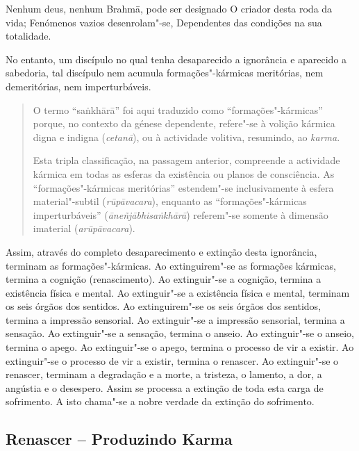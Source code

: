 
\clearpage

Nenhum deus, nenhum Brahmā, pode ser designado O criador desta roda da vida;
Fenómenos vazios desenrolam"-se, Dependentes das condições na sua totalidade.


No entanto, um discípulo no qual tenha desaparecido a ignorância e aparecido a
sabedoria, tal discípulo nem acumula formações"-kármicas meritórias, nem
demeritórias, nem imperturbáveis.


\begin{quote}
  O termo “sa\.{n}khārā” foi aqui traduzido como “formações"-kármicas” porque, no
  contexto da génese dependente, refere"-se à volição kármica digna e indigna
  (\emph{cetanā}), ou à actividade volitiva, resumindo, ao \emph{karma}.

  Esta tripla classificação, na passagem anterior, compreende a actividade
  kármica em todas as esferas da existência ou planos de consciência. As
  “formações"-kármicas meritórias” estendem"-se inclusivamente à esfera
  material"-subtil (\emph{rūpāvacara}), enquanto as “formações"-kármicas
  imperturbáveis” (\emph{āneñjābhisa\.{n}khārā}) referem"-se somente à dimensão
  imaterial (\emph{arūpāvacara}).
\end{quote}

Assim, através do completo desaparecimento e extinção desta ignorância, terminam
as formações"-kármicas. Ao extinguirem"-se as formações kármicas, termina a
cognição (renascimento). Ao extinguir"-se a cognição, termina a existência física
e mental. Ao extinguir"-se a existência física e mental, terminam os seis órgãos
dos sentidos. Ao extinguirem"-se os seis órgãos dos sentidos, termina a impressão
sensorial. Ao extinguir"-se a impressão sensorial, termina a sensação. Ao
extinguir"-se a sensação, termina o anseio. Ao extinguir"-se o anseio, termina o
apego. Ao extinguir"-se o apego, termina o processo de vir a existir. Ao
extinguir"-se o processo de vir a existir, termina o renascer. Ao extinguir"-se o
renascer, terminam a degradação e a morte, a tristeza, o lamento, a dor, a
angústia e o desespero. Assim se processa a extinção de toda esta carga de
sofrimento. A isto chama"-se a nobre verdade da extinção do sofrimento.


\subsection{Renascer -- Produzindo Karma}

